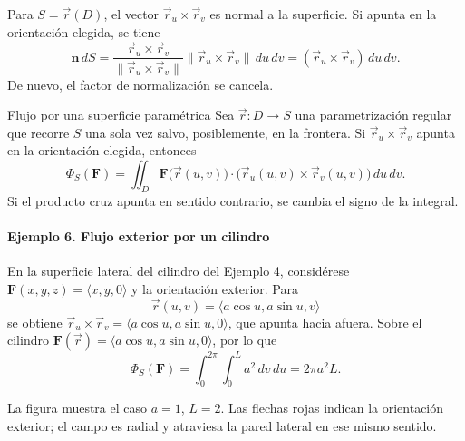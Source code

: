 Para $S=\vec r(D)$, el vector $\vec r_u\times\vec r_v$ es normal a la superficie. Si apunta en la orientación elegida, se tiene
\[
\mathbf n\,dS
=\frac{\vec r_u\times\vec r_v}
{\lVert\vec r_u\times\vec r_v\rVert}
\lVert\vec r_u\times\vec r_v\rVert\,du\,dv
 =(\vec r_u\times\vec r_v)\,du\,dv.
\]
De nuevo, el factor de normalización se cancela.

\begin{mytheorem}{Flujo por una superficie paramétrica}
Sea $\vec r:D\to S$ una parametrización regular que recorre $S$ una sola vez salvo, posiblemente, en la frontera. Si $\vec r_u\times\vec r_v$ apunta en la orientación elegida, entonces
\[
\Phi_S(\mathbf F)
=\iint_D\mathbf F\bigl(\vec r(u,v)\bigr)
\cdot\bigl(\vec r_u(u,v)\times\vec r_v(u,v)\bigr)\,du\,dv.
\]
Si el producto cruz apunta en sentido contrario, se cambia el signo de la integral.
\end{mytheorem}

\paragraph{Ejemplo 6. Flujo exterior por un cilindro}
En la superficie lateral del cilindro del Ejemplo 4, considérese $\mathbf F(x,y,z)=\langle x,y,0\rangle$ y la orientación exterior. Para
\[
\vec r(u,v)=\langle a\cos u,a\sin u,v\rangle
\]
se obtiene $\vec r_u\times\vec r_v=\langle a\cos u,a\sin u,0\rangle$, que apunta hacia afuera. Sobre el cilindro $\mathbf F(\vec r)=\langle a\cos u,a\sin u,0\rangle$, por lo que
\[
\Phi_S(\mathbf F)
=\int_0^{2\pi}\int_0^L a^2\,dv\,du
=2\pi a^2L.
\]
\begin{minipage}{\textwidth}
\begingroup\shorthandoff{>}
\begin{center}
\end{center}
\endgroup
La figura muestra el caso $a=1$, $L=2$. Las flechas rojas indican la orientación exterior; el campo es radial y atraviesa la pared lateral en ese mismo sentido.
\end{minipage}


